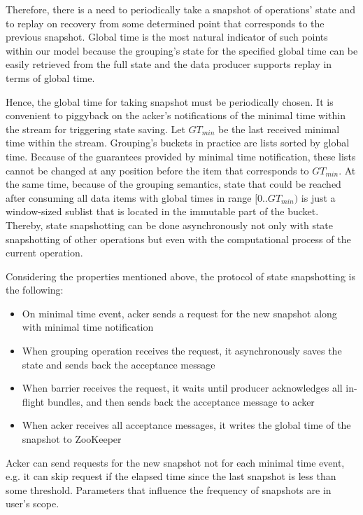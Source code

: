 Therefore, there is a need to periodically take a snapshot of operations' state and to replay on recovery from some determined point that corresponds to the previous snapshot. Global time is the most natural indicator of such points within our model because the grouping's state for the specified global time can be easily retrieved from the full state and the data producer supports replay in terms of global time.   

Hence, the global time for taking snapshot must be periodically chosen. It is convenient to piggyback on the acker's notifications of the minimal time within the stream for triggering state saving. Let $GT_{min}$ be the last received minimal time within the stream. Grouping's buckets in practice are lists sorted by global time. Because of the guarantees provided by minimal time notification, these lists cannot be changed at any position before the item that corresponds to $GT_{min}$. At the same time, because of the grouping semantics, state that could be reached after consuming all data items with global times in range $[0..GT_{min})$ is just a window-sized sublist that is located in the immutable part of the bucket. Thereby, state snapshotting can be done asynchronously not only with state snapshotting of other operations but even with the computational process of the current operation. 

Considering the properties mentioned above, the protocol of state snapshotting is the following:

\begin{itemize}
    \item On minimal time event, acker sends a request for the new snapshot along with minimal time notification
    \item When grouping operation receives the request, it asynchronously saves the state and sends back the acceptance message   
    \item When barrier receives the request, it waits until producer acknowledges all in-flight bundles, and then sends back the acceptance message to acker
    \item When acker receives all acceptance messages, it writes the global time of the snapshot to ZooKeeper 
\end{itemize}

Acker can send requests for the new snapshot not for each minimal time event, e.g. it can skip request if the elapsed time since the last snapshot is less than some threshold. Parameters that influence the frequency of snapshots are in user's scope.

